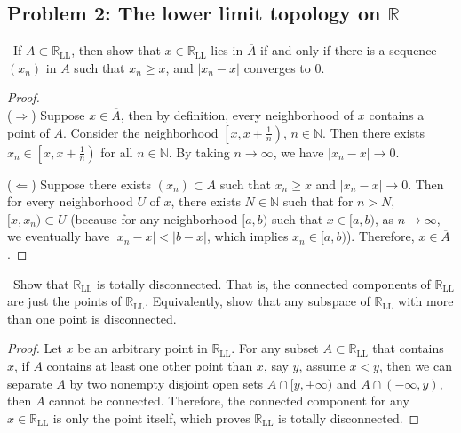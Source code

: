 \documentclass[12pt, a4paper]{amsart}
\newcommand{\turnin}{\faPencilSquareO}
\newcommand{\bbR}{\mathbb{R}}
\newcommand{\LL}{\operatorname{LL}}
\begin{document}
\subsection*{Problem 2: The lower limit topology on $\bbR$}
\begin{compactenum}[(a)]
  \setlength{\itemsep}{0.5em}
\item \turnin\ If $A \subset \bbR_{\LL}$, then show that $x \in \bbR_{\LL}$ lies in $\overline{A}$ if and only if there is a sequence $(x_n)$ in $A$ such that $x_n \geq x$, and $|x_n - x|$ converges to $0$.

\begin{proof}$ $\\
\noindent ($\Rightarrow$) Suppose $x\in\overline{A}$, 
then by definition, every neighborhood of $x$ contains a point of $A$. 
Consider the neighborhood $\left[x, x+\frac{1}{n}\right)$, $n\in\mathbb{N}$.
Then there exists $x_n \in \left[x, x+\frac{1}{n}\right)$ for all $n\in\mathbb{N}$.
By taking $n\to\infty$, we have $|x_n - x| \to 0$.

\noindent ($\Leftarrow$) Suppose there exists $(x_n) \subset A$ such that $x_n\ge x$ and $|x_n - x|\to 0$. Then for every neighborhood $U$ of $x$, there exists $N\in\mathbb{N}$ 
such that for $n>N$, $[x,x_n) \subset U$ (because for any neighborhood $[a,b)$ such that $x \in [a,b)$, as $n\to\infty$, we eventually have $|x_n-x| < |b-x|$, which implies $x_n \in [a,b)$). Therefore, $x\in\overline{A}$.
\end{proof}

\item \turnin\ Show that $\bbR_{\LL}$ is totally disconnected.
  That is, the connected components of $\bbR_{\LL}$ are just the points of $\bbR_{\LL}$.
  Equivalently, show that any subspace of $\bbR_{\LL}$ with more than one point is disconnected.
  
\begin{proof}
Let $x$ be an arbitrary point in $\bbR_{\LL}$. For any subset $A \subset \bbR_{\LL}$ 
that contains $x$, if $A$ contains at least one other point than $x$, say $y$, assume $x<y$, then we can separate 
$A$ by two nonempty disjoint open sets $A\cap [y, +\infty)$ and $A \cap (-\infty, y)$, then $A$ cannot be connected.
Therefore, the connected component for any $x\in\bbR_{\LL}$ is only the point itself, 
which proves $\bbR_{\LL}$ is totally disconnected.
\end{proof}

\end{compactenum}
\vspace{1em}
\end{document}
